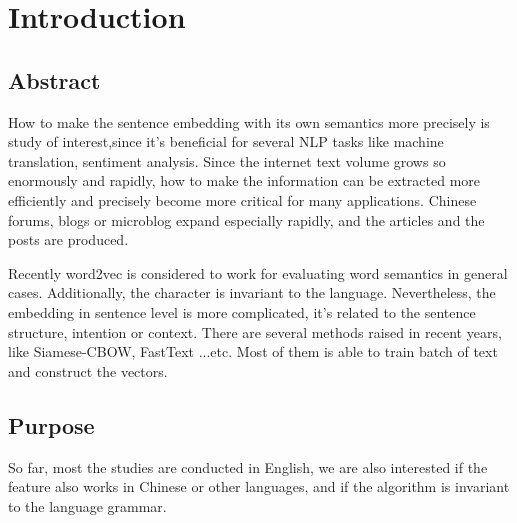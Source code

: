 \chapter{Introduction}
\setlength{\baselineskip}{1.5em}
\setlength{\parindent}{2em}
\setlength{\parskip}{1em}

\section{Abstract}

How to make the sentence embedding with its own semantics more precisely is study of interest,since it's beneficial for several NLP tasks like machine translation, sentiment analysis. Since the internet text volume grows so enormously and rapidly, how to make the information can be extracted more efficiently and precisely become more critical for many applications. Chinese forums, blogs or microblog expand especially rapidly, and the articles and the posts are produced.

Recently word2vec\cite{word2vec} is considered to work for evaluating word semantics in general cases.  Additionally, the character is invariant to the language. Nevertheless, the embedding in sentence level is more complicated, it's related to the sentence structure,  intention or context. There are several methods raised in recent years, like Siamese-CBOW, FastText ...etc. Most of them is able to train batch of text and construct the vectors.

\section{Purpose}

So far, most the studies are conducted in English, we are also interested if the feature also works in Chinese or other languages, and if the algorithm is invariant to the language grammar. 